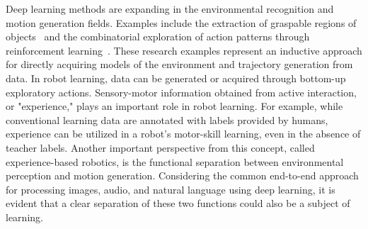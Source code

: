 Deep learning methods are expanding in the environmental recognition and motion generation fields. Examples include the extraction of graspable regions of objects~\cite{Pinto2016icra,Mahler2017dex,Mousavian2019iccv} and the combinatorial exploration of action patterns through reinforcement learning~\cite{Levine2016jmlr,Levine2017ijrr}. These research examples represent an inductive approach for directly acquiring models of the environment and trajectory generation from data. In robot learning, data can be generated or acquired through bottom-up exploratory actions. Sensory-motor information obtained from active interaction, or "experience," plays an important role in robot learning. For example, while conventional learning data are annotated with labels provided by humans, experience can be utilized in a robot's motor-skill learning, even in the absence of teacher labels. Another important perspective from this concept, called experience-based robotics, is the functional separation between environmental perception and motion generation. Considering the common end-to-end approach for processing images, audio, and natural language using deep learning, it is evident that a clear separation of these two functions could also be a subject of learning.



